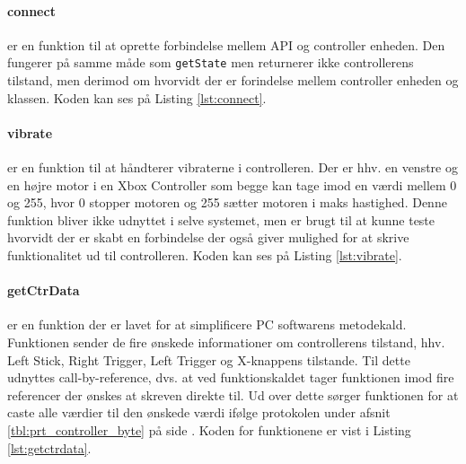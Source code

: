 \clearpage

\paragraph{connect} er en funktion til at oprette forbindelse mellem API og controller enheden. Den fungerer på samme måde som \texttt{getState} men returnerer ikke controllerens tilstand, men derimod om hvorvidt der er forindelse mellem controller enheden og klassen. Koden kan ses på Listing \ref{lst:connect}.




\paragraph{vibrate} er en funktion til at håndterer vibraterne i controlleren. Der er hhv. en venstre og en højre motor i en Xbox Controller som begge kan tage imod en værdi mellem 0 og 255, hvor 0 stopper motoren og 255 sætter motoren i maks hastighed. Denne funktion bliver ikke udnyttet i selve systemet, men er brugt til at kunne teste hvorvidt der er skabt en forbindelse der også giver mulighed for at skrive funktionalitet ud til controlleren.  Koden kan ses på Listing \ref{lst:vibrate}.



\clearpage

\paragraph{getCtrData} er en funktion der er lavet for at simplificere PC softwarens metodekald. Funktionen sender de fire ønskede informationer om controllerens tilstand, hhv. Left Stick, Right Trigger, Left Trigger og X-knappens tilstande. Til dette udnyttes call-by-reference, dvs. at ved funktionskaldet tager funktionen imod fire referencer der ønskes at skreven direkte til. Ud over dette sørger funktionen for at caste alle værdier til den ønskede værdi ifølge protokolen under afsnit \ref{tbl:prt_controller_byte}  på side \pageref{tbl:prt_controller_byte}. Koden for funktionene er vist i Listing \ref{lst:getctrdata}.


